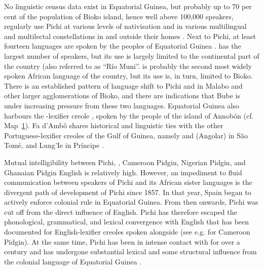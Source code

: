 No linguistic census data exist in Equatorial Guinea, but probably up to 70 per cent of the population of Bioko island, hence well above 100,000 speakers, regularly use Pichi at various levels of nativisation and in various multilingual and multilectal constellations in and outside their homes \citep[194]{Yakpo2013}. Next to Pichi, at least fourteen languages are spoken by the peoples of Equatorial Guinea \citep{Hammarstrom2017}.  has the largest number of speakers, but its use is largely limited to the continental part of the country (also referred to as “Río Muni”\textstyleannotationreference{)}.  is probably the second most widely spoken African language of the country, but its use is, in turn, limited to Bioko. There is an established pattern of language shift to Pichi and  in Malabo and other larger agglomerations of Bioko, and there are indications that Bube is under increasing pressure from these two languages. Equatorial Guinea also harbours the -lexifier creole , spoken by the people of the island of Annobón (cf. Map~\hyperref[map:1:1.1]{1}). Fa d’Ambô shares historical and linguistic ties with the other Portuguese-lexifier creoles of the Gulf of Guinea, namely  and  (Angolar) in São Tomé, and Lung’Ie in Príncipe \citep{Post2013}. 

Mutual intelligibility between Pichi, , Cameroon Pidgin, Nigerian Pidgin, and Ghanaian Pidgin English is relatively high. However, an impediment to fluid communication between speakers of Pichi and its African sister languages is the divergent path of development of Pichi since 1857. In that year, Spain began to actively enforce colonial rule in Equatorial Guinea. From then onwards, Pichi was cut off from the direct influence of English. Pichi has therefore escaped the phonological, grammatical, and lexical convergence with English that has been documented for English-lexifier creoles spoken alongside  (see e.g. \citealt{SalaNgefac2006} for Cameroon Pidgin). At the same time, Pichi has been in intense contact with  for over a century and has undergone substantial lexical and some structural influence from the colonial language of Equatorial Guinea . 

